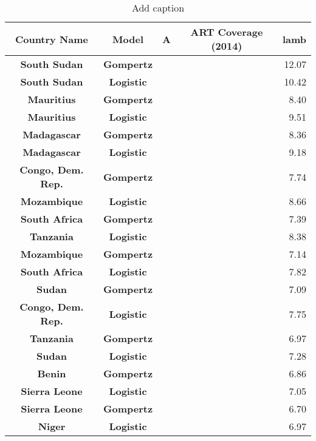 \begin{table}[htbp]
  \centering
  \caption{Add caption}
    \begin{tabular}{ccrrr}
    \toprule
    \textbf{Country Name} & \textbf{Model} & \multicolumn{1}{c}{\textbf{A}} & \multicolumn{1}{c}{\textbf{ART Coverage (2014)}} & \multicolumn{1}{c}{\textbf{lamb}} \\
    \midrule
    \textbf{South Sudan} & \textbf{Gompertz} &       &       & 12.07 \\
    \textbf{South Sudan} & \textbf{Logistic} &       &       & 10.42 \\
    \textbf{Mauritius} & \textbf{Gompertz} &       &       & 8.40 \\
    \textbf{Mauritius} & \textbf{Logistic} &       &       & 9.51 \\
    \textbf{Madagascar} & \textbf{Gompertz} &       &       & 8.36 \\
    \textbf{Madagascar} & \textbf{Logistic} &       &       & 9.18 \\
    \textbf{Congo, Dem. Rep.} & \textbf{Gompertz} &       &       & 7.74 \\
    \textbf{Mozambique} & \textbf{Logistic} &       &       & 8.66 \\
    \textbf{South Africa} & \textbf{Gompertz} &       &       & 7.39 \\
    \textbf{Tanzania} & \textbf{Logistic} &       &       & 8.38 \\
    \textbf{Mozambique} & \textbf{Gompertz} &       &       & 7.14 \\
    \textbf{South Africa} & \textbf{Logistic} &       &       & 7.82 \\
    \textbf{Sudan} & \textbf{Gompertz} &       &       & 7.09 \\
    \textbf{Congo, Dem. Rep.} & \textbf{Logistic} &       &       & 7.75 \\
    \textbf{Tanzania} & \textbf{Gompertz} &       &       & 6.97 \\
    \textbf{Sudan} & \textbf{Logistic} &       &       & 7.28 \\
    \textbf{Benin} & \textbf{Gompertz} &       &       & 6.86 \\
    \textbf{Sierra Leone} & \textbf{Logistic} &       &       & 7.05 \\
    \textbf{Sierra Leone} & \textbf{Gompertz} &       &       & 6.70 \\
    \textbf{Niger} & \textbf{Logistic} &       &       & 6.97 \\
    \bottomrule
    \end{tabular}%
  \label{tab:addlabel}%
\end{table}%
